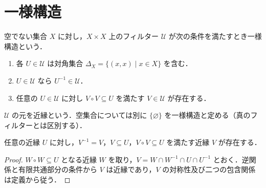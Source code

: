\section{一様構造}
\begin{defn}[一様構造]
空でない集合 $X$ に対し，$X\times X$ 上のフィルター $\mathcal U$ が次の条件を満たすとき一様構造という．
\begin{enumerate}
\item 各 $U\in\mathcal U$ は対角集合 $\Delta_X=\{(x,x)\mid x\in X\}$ を含む．
\item $U\in\mathcal U$ なら $U^{-1}\in\mathcal U$．
\item 任意の $U\in\mathcal U$ に対し $V\circ V\subseteq U$ を満たす $V\in\mathcal U$ が存在する．
\end{enumerate}
$\mathcal U$ の元を近縁という．空集合については別に $\{\varnothing\}$ を一様構造と定める（真のフィルターとは区別する）．
\end{defn}
\begin{prop}[対称近縁による縮小]
任意の近縁 $U$ に対し，$V^{-1}=V$，$V\subseteq U$，$V\circ V\subseteq U$ を満たす近縁 $V$ が存在する．
\end{prop}
\begin{proof}
$W\circ W\subseteq U$ となる近縁 $W$ を取り，$V=W\cap W^{-1}\cap U\cap U^{-1}$ とおく．逆関係と有限共通部分の条件から $V$ は近縁であり，$V$ の対称性及び二つの包含関係は定義から従う．
\end{proof}
